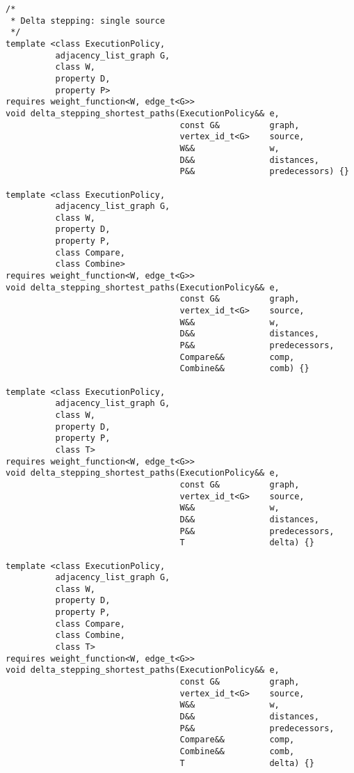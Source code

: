 \begin{lstlisting}
/*
 * Delta stepping: single source
 */
template <class ExecutionPolicy,
          adjacency_list_graph G,
          class W,
          property D,
          property P>
requires weight_function<W, edge_t<G>>
void delta_stepping_shortest_paths(ExecutionPolicy&& e,
                                   const G&          graph,
                                   vertex_id_t<G>    source,
                                   W&&               w,
                                   D&&               distances,
                                   P&&               predecessors) {}

template <class ExecutionPolicy,
          adjacency_list_graph G,
          class W,
          property D,
          property P,
          class Compare,
          class Combine>
requires weight_function<W, edge_t<G>>
void delta_stepping_shortest_paths(ExecutionPolicy&& e,
                                   const G&          graph,
                                   vertex_id_t<G>    source,
                                   W&&               w,
                                   D&&               distances,
                                   P&&               predecessors,
                                   Compare&&         comp,
                                   Combine&&         comb) {}

template <class ExecutionPolicy,
          adjacency_list_graph G,
          class W,
          property D,
          property P,
          class T>
requires weight_function<W, edge_t<G>>
void delta_stepping_shortest_paths(ExecutionPolicy&& e,
                                   const G&          graph,
                                   vertex_id_t<G>    source,
                                   W&&               w,
                                   D&&               distances,
                                   P&&               predecessors,
                                   T                 delta) {}

template <class ExecutionPolicy,
          adjacency_list_graph G,
          class W,
          property D,
          property P,
          class Compare,
          class Combine,
          class T>
requires weight_function<W, edge_t<G>>
void delta_stepping_shortest_paths(ExecutionPolicy&& e,
                                   const G&          graph,
                                   vertex_id_t<G>    source,
                                   W&&               w,
                                   D&&               distances,
                                   P&&               predecessors,
                                   Compare&&         comp,
                                   Combine&&         comb,
                                   T                 delta) {}


\end{lstlisting}
